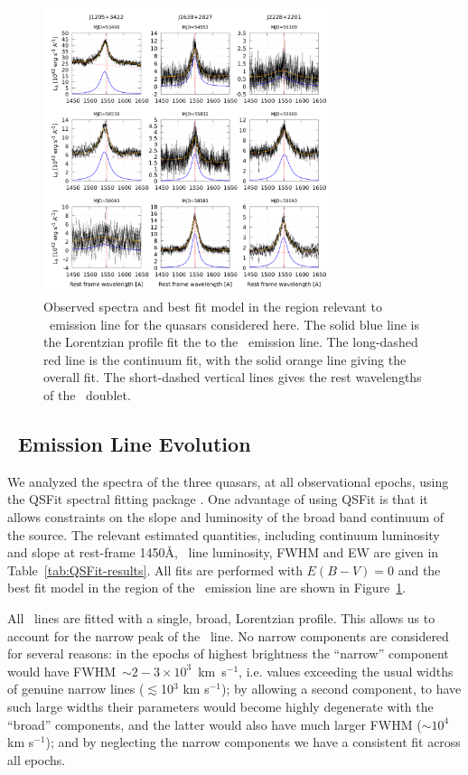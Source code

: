 \documentclass[fleqn,usenatbib]{mnras}
\begin{document}
\begin{figure}
  \centering
  \includegraphics[width=8.40cm, trim=0.37cm 0.3cm 0.0cm 0.2cm, clip]{figures/CIVregions.png}
    \vspace{-18pt}
  \caption{Observed spectra and best fit model in the region relevant
    to \civ\ emission line for the quasars considered here.
    The solid blue line is the Lorentzian profile fit the to the \civ\ emission line.
    The long-dashed red line is the continuum fit, with the solid orange
    line giving the overall fit. The short-dashed vertical lines gives the
    rest wavelengths of the \civ\ doublet. }
  \label{fig:QSFit-CIV}
\end{figure}
\subsection{\civ\ Emission Line Evolution}
We analyzed the spectra of the three quasars, at all observational
epochs, using the QSFit spectral fitting package
\citep{Calderone2017}.  One advantage of using QSFit is that it allows
constraints on the slope and luminosity of the broad band continuum of
the source. The relevant estimated quantities, including continuum
luminosity and slope at rest-frame 1450\AA, \civ\ line luminosity,
FWHM and EW are given in Table~\ref{tab:QSFit-results}. All fits are
performed with $E(B-V) = 0$ and the best fit model in the region of
the \civ\ emission line are shown in Figure~\ref{fig:QSFit-CIV}.

All \civ\ lines are fitted with a single, broad, Lorentzian profile.
This allows us to account for the narrow peak of the \civ\ line.  No
narrow components are considered for several reasons: in the epochs of
highest brightness the ``narrow'' component would have FWHM~$\sim2-3
\times 10^{3}$~km~s$^{-1}$, i.e. values exceeding the usual widths of
genuine narrow lines ($\lesssim$10$^{3}$ km s$^{-1}$); by allowing a
second component, to have such large widths their parameters would
become highly degenerate with the ``broad'' components, and the latter
would also have much larger FWHM ($\sim$$10^{4}$ km s$^{-1}$); and by
neglecting the narrow components we have a consistent fit across all
epochs.
\end{document}
